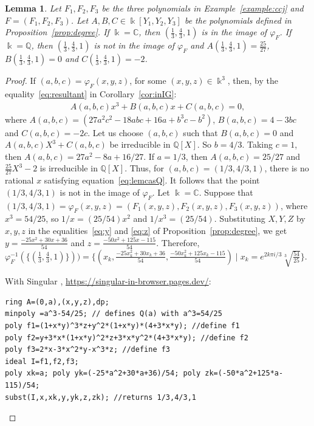 \documentclass[11pt,reqno]{amsart}
\newtheorem{lemma}[theorem]{Lemma}
\theoremstyle{definition}
\newcommand{\mbk}{\mbox{$\Bbbk$}}
\newcommand{\mbc}{\mbox{$\mathbb{C}$}}
\newcommand{\mbq}{\mbox{$\mathbb{Q}$}}
\begin{document}
\begin{lemma}\label{lem:casQ}
Let $F_1,F_2,F_3$ be the three polynomials in {\rm Example~\ref{example:ccj}} and $F=(F_1,F_2,F_3)$. 
Let $A,B,C\in\mbk[Y_1,Y_2,Y_3]$ be the polynomials defined in {\rm Proposition~\ref{prop:degree}}.
If $\mbk=\mbc$, then $(\tfrac{1}{3},\tfrac{4}{3},1)$ is in the image of $\varphi_F$.  If $\mbk=\mbq$, then $(\tfrac{1}{3},\tfrac{4}{3},1)$ is not in the image of $\varphi_F$ and $A(\tfrac{1}{3},\tfrac{4}{3},1)=\frac{25}{27}$, $B(\tfrac{1}{3},\tfrac{4}{3},1)=0$ and $C(\tfrac{1}{3},\tfrac{4}{3},1)=-2$.
\end{lemma}
\begin{proof}
If $(a,b,c)=\varphi_F(x,y,z)$, for some $(x,y,z)\in\mbk^3$, then, 
by the equality~\eqref{eq:resultant} in Corollary~\ref{cor:inIG}:
\begin{eqnarray}\label{eq:lemcasQ}
A(a,b,c)x^3+B(a,b,c)x+C(a,b,c)=0,
\end{eqnarray}
where $A(a,b,c)=(27a^2c^2-18abc+16a+b^3c-b^2)$, $B(a,b,c)=4-3bc$ and $C(a,b,c)=-2c$. Let us choose $(a,b,c)$ such that $B(a,b,c)=0$ and $A(a,b,c)X^3+C(a,b,c)$ be irreducible in $\mbq[X]$. So $b=4/3$. Taking $c=1$, then $A(a,b,c)=27a^2-8a+16/27$. If $a=1/3$, then $A(a,b,c)=25/27$ and $\tfrac{25}{27}X^3-2$ is irreducible in $\mbq[X]$. Thus, for $(a,b,c)=(1/3,4/3,1)$, there is no rational $x$ satisfying equation~\eqref{eq:lemcasQ}. It follows that the point $(1/3,4/3,1)$ is not in the image of $\varphi_F$. 
Let $\mbk=\mbc$. Suppose that $(1/3,4/3,1)=\varphi_F(x,y,z)=(F_1(x,y,z),F_2(x,y,z),F_3(x,y,z))$, where
$x^3=54/25$, so $1/x=(25/54)x^2$ and $1/x^3=(25/54)$. Substituting $X,Y,Z$ by $x,y,z$ in the equalities~\eqref{eq:y} and \eqref{eq:z} of Proposition~\ref{prop:degree}, 
we get $y=\tfrac{-25x^2+30x+36}{54}$ and $z=\tfrac{-50x^2+125x-115}{54}$. Therefore, 
$\varphi_F^{-1}(\{(\tfrac{1}{3},\tfrac{4}{3},1)\}))=\{(x_k,\tfrac{-25x_k^2+30x_k+36}{54},\tfrac{-50x_k^2+125x_k-115}{54})\mid x_k=e^{2k\pi i/3}\sqrt[3]{\tfrac{54}{25}}\}$.

With {\sc Singular} \cite{dgps}, \url{https://singular-in-browser.pages.dev/}:
\begin{verbatim}
ring A=(0,a),(x,y,z),dp; 
minpoly =a^3-54/25; // defines Q(a) with a^3=54/25
poly f1=(1+x*y)^3*z+y^2*(1+x*y)*(4+3*x*y); //define f1 
poly f2=y+3*x*(1+x*y)^2*z+3*x*y^2*(4+3*x*y); //define f2
poly f3=2*x-3*x^2*y-x^3*z; //define f3
ideal I=f1,f2,f3; 
poly xk=a; poly yk=(-25*a^2+30*a+36)/54; poly zk=(-50*a^2+125*a-115)/54;
subst(I,x,xk,y,yk,z,zk); //returns 1/3,4/3,1
\end{verbatim}
\end{proof}
\end{document}
